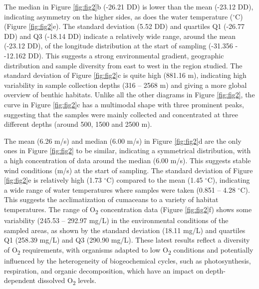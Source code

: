 The median in Figure \ref{fig:fig2}b (-26.21 DD) is lower than the mean (-23.12 DD), indicating asymmetry on the higher sides, as does the water temperature ($^\circ$C) (Figure \ref{fig:fig2}e). The standard deviation (5.52 DD) and quartiles Q1 (-26.77 DD) and Q3 (-18.14 DD) indicate a relatively wide range, around the mean (-23.12 DD), of the longitude distribution at the start of sampling (-31.356 - -12.162 DD). This suggests a strong environmental gradient, geographic distribution and sample diversity from east to west in the region studied. The standard deviation of Figure \ref{fig:fig2}c is quite high (881.16 m), indicating high variability in sample collection depths (316 – 2568 m) and giving a more global overview of benthic habitats. Unlike all the other diagrams in Figure \ref{fig:fig2}, the curve in Figure \ref{fig:fig2}c has a multimodal shape with three prominent peaks, suggesting that the samples were mainly collected and concentrated at three different depths (around 500, 1500 and 2500 m).

The mean (6.26 m/s) and median (6.00 m/s) in Figure \ref{fig:fig2}d are the only ones in Figure \ref{fig:fig2} to be similar, indicating a symmetrical distribution, with a high concentration of data around the median (6.00 m/s). This suggests stable wind conditions (m/s) at the start of sampling. The standard deviation of Figure \ref{fig:fig2}e is relatively high (1.73 $^\circ$C) compared to the mean (1.45 $^\circ$C), indicating a wide range of water temperatures where samples were taken (0.851 – 4.28 $^\circ$C). This suggests the acclimatization of cumaceans to a variety of habitat temperatures. The range of O\textsubscript{2} concentration data (Figure \ref{fig:fig2}f) shows some variability (245.53 – 292.97 mg/L) in the environmental conditions of the sampled areas, as shown by the standard deviation (18.11 mg/L) and quartiles Q1 (258.39 mg/L) and Q3 (290.90 mg/L). These latest results reflect a diversity of O\textsubscript{2} requirements, with organisms adapted to low O\textsubscript{2} conditions and potentially influenced by the heterogeneity of biogeochemical cycles, such as photosynthesis, respiration, and organic decomposition, which have an impact on depth-dependent dissolved  O\textsubscript{2} levels.

